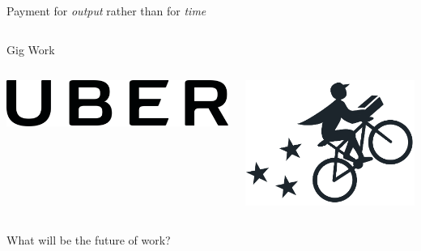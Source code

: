 \documentclass[presentation]{subfiles}
\begin{document}
\begin{frame}[t]{Payment for \emph{output} rather than for \emph{time}}
{\begin{columns}[b]
      \begin{column}[t]{0.45\textwidth}
        \centering
        Gig Work
        \begin{columns}
          \begin{column}{.5\textwidth}
            \includegraphics[max width=\linewidth,max height=\textheight,keepaspectratio]{../../../presentations/common_figures/uber.png}
          \end{column}
          \begin{column}{.5\textwidth}
            \includegraphics[max width=\linewidth,max height=\textheight,keepaspectratio]{../../../presentations/common_figures/postmates.png}
          \end{column}
        \end{columns}
      \end{column}
    \end{columns}
  }
\end{frame}


\begin{frame}[standout]
    What will be the future of work?
\end{frame}
\end{document}
